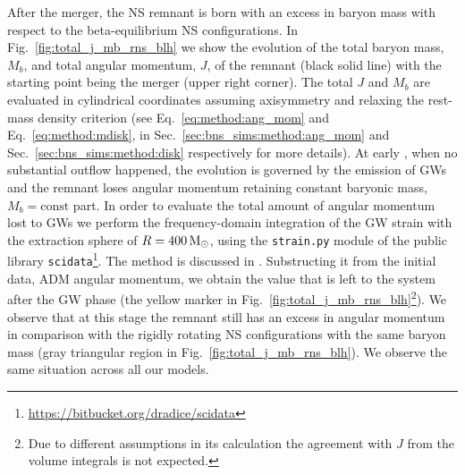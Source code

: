 After the merger, the \ac{NS} remnant is born with an excess in baryon mass
with respect to the beta-equilibrium \ac{NS} configurations.
%
In Fig.~\ref{fig:total_j_mb_rns_blh} we show the evolution of the 
total baryon mass, $M_b$, and total angular momentum, $J$, of the remnant
(black solid line) 
with the starting point being the merger (upper right corner).
%
The total $J$ and $M_b$ are evaluated in cylindrical coordinates assuming 
axisymmetry and relaxing the rest-mass density criterion 
(see Eq.~\eqref{eq:method:ang_mom} and Eq.~\eqref{eq:method:mdisk},
in Sec.~\ref{sec:bns_sims:method:ang_mom} and Sec.~\ref{sec:bns_sims:method:disk} respectively for more details).
%
%
At early \pmerg{}, when no substantial outflow happened, the 
evolution is governed by the emission of \acp{GW} and the remnant loses 
angular momentum retaining constant baryonic mass, $M_b=\text{const}$ part.
%
In order to evaluate the total amount of angular momentum lost to 
\acp{GW} we perform the frequency-domain integration of the \ac{GW} 
strain with the extraction sphere of $R=400\,{\text{M}_{\odot}}$, using the 
\texttt{strain.py} module of the public library 
\texttt{scidata}\footnote{\url{https://bitbucket.org/dradice/scidata}}.
The method is discussed in 
\citet{Damour:2011fu,Bernuzzi:2012ci,Bernuzzi:2015rla}.
%
%
Substructing it from the initial data, \ac{ADM} angular momentum,  %
we obtain the value that is left to the system after the \ac{GW} phase 
(the yellow marker in Fig.~\ref{fig:total_j_mb_rns_blh}\footnote{
    Due to different assumptions in its calculation the agreement 
    with $J$ from the volume integrals is not expected.
}).
%
We observe that at this stage the remnant still has an excess in angular momentum
in comparison with the rigidly rotating \ac{NS} configurations with the same baryon mass 
(gray triangular region in Fig.~\ref{fig:total_j_mb_rns_blh}).
%
We observe the same situation across all our models.%


